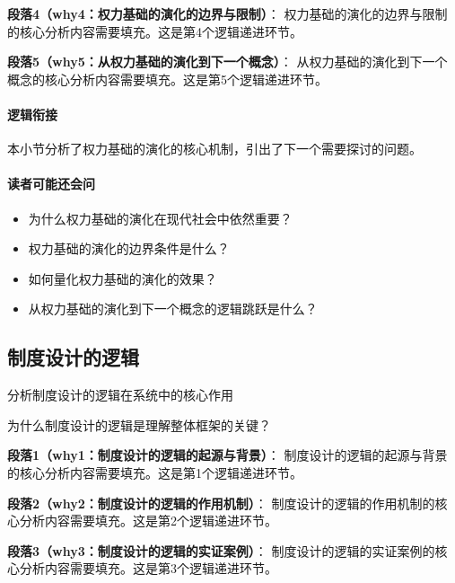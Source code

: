 \documentclass[../main.tex]{subfiles}
\begin{document}
{{\textbf{段落4（why4：权力基础的演化的边界与限制）}：
权力基础的演化的边界与限制的核心分析内容需要填充。这是第4个逻辑递进环节。


\textbf{段落5（why5：从权力基础的演化到下一个概念）}：
从权力基础的演化到下一个概念的核心分析内容需要填充。这是第5个逻辑递进环节。


\paragraph*{逻辑衔接}
本小节分析了权力基础的演化的核心机制，引出了下一个需要探讨的问题。

\paragraph*{读者可能还会问}
\begin{itemize}
\item 为什么权力基础的演化在现代社会中依然重要？
\item 权力基础的演化的边界条件是什么？
\item 如何量化权力基础的演化的效果？
\item 从权力基础的演化到下一个概念的逻辑跳跃是什么？
\end{itemize}


\subsection{制度设计的逻辑}

\begin{motivation}
分析制度设计的逻辑在系统中的核心作用
\end{motivation}

\begin{logicmap}
[逻辑链占位]
\end{logicmap}

\begin{questionbox}
为什么制度设计的逻辑是理解整体框架的关键？
\end{questionbox}

\textbf{段落1（why1：制度设计的逻辑的起源与背景）}：
制度设计的逻辑的起源与背景的核心分析内容需要填充。这是第1个逻辑递进环节。


\textbf{段落2（why2：制度设计的逻辑的作用机制）}：
制度设计的逻辑的作用机制的核心分析内容需要填充。这是第2个逻辑递进环节。


\textbf{段落3（why3：制度设计的逻辑的实证案例）}：
制度设计的逻辑的实证案例的核心分析内容需要填充。这是第3个逻辑递进环节。


}}
\end{document}
